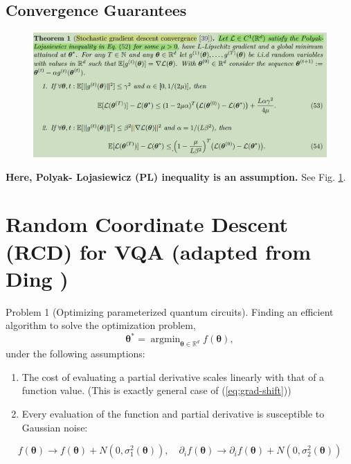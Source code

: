\documentclass[
        11pt, %
	a4paper, %
]{LegrandOrangeBook}
\begin{document}
\subsection{Convergence Guarantees}

\begin{figure}
    \centering
    \includegraphics[width=1\linewidth]{Images/sgd-convergence.png}
    \label{fig:sgd-convergence}
\end{figure}

\textbf{Here, Polyak- Lojasiewicz (PL) inequality is an assumption.} See Fig. \ref{fig:sgd-convergence}.

\section{Random Coordinate Descent (RCD) for VQA (adapted from Ding \cite{ding2023random})}

\begin{problem}
    Problem 1 (Optimizing parameterized quantum circuits). Finding an efficient algorithm to solve the optimization problem,
\begin{equation}
    \boldsymbol{\theta}^*=\operatorname{argmin}_{\boldsymbol{\theta} \in \mathbb{R}^d} f(\boldsymbol{\theta}),
\end{equation}
under the following assumptions:
\begin{enumerate}
    \item The cost of evaluating a partial derivative scales linearly with that of a function value. (This is exactly general case of (\ref{eq:grad-shift}))
    \item Every evaluation of the function and partial derivative is susceptible to Gaussian noise:
\end{enumerate}
\begin{equation}
    f(\boldsymbol{\theta}) \rightarrow f(\boldsymbol{\theta})+N\left(0, \sigma_1^2(\boldsymbol{\theta})\right), \quad \partial_i f(\boldsymbol{\theta}) \rightarrow \partial_i f(\boldsymbol{\theta})+N\left(0, \sigma_2^2(\boldsymbol{\theta})\right)
\end{equation}
\end{problem}
\end{document}
